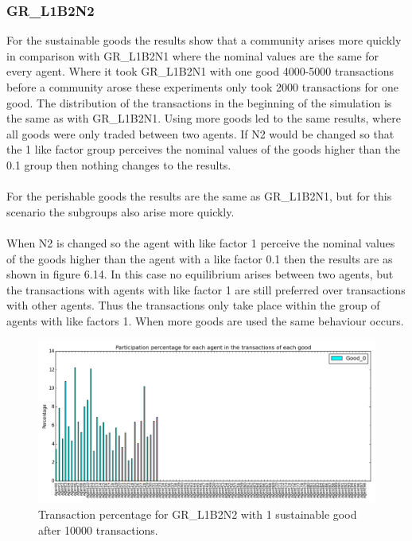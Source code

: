 \documentclass[twoside,openright]{uva-bachelor-thesis}
\begin{document}
\clearpage
\subsubsection{GR\_L1B2N2}
For the sustainable goods the results show that a community arises more quickly in comparison with GR\_L1B2N1 where the nominal values are the same for every agent. Where it took GR\_L1B2N1 with one good 4000-5000 transactions before a community arose these experiments only took 2000 transactions for one good. The distribution of the transactions in the beginning of the simulation is the same as with GR\_L1B2N1. Using more goods led to the same results, where all goods were only traded between two agents. If N2 would be changed so that the 1 like factor group perceives the nominal values of the goods higher than the 0.1 group then nothing changes to the results.\\
\\
For the perishable goods the results are the same as GR\_L1B2N1, but for this scenario the subgroups also arise more quickly.
\\
\\
When N2 is changed so the agent with like factor 1 perceive the nominal values of the goods higher than the agent with a like factor 0.1 then the results are as shown in figure 6.14. In this case no equilibrium arises between two agents, but the transactions with agents with like factor 1 are still preferred over transactions with other agents. Thus the transactions only take place within the group of agents with like factors 1. When more goods are used the same behaviour occurs. \\
\begin{figure}[h!]
\centering
\includegraphics[scale=0.4]{Simulation2_figures/GR_L1B2N2_321/Figure1_10k} 
\caption{Transaction percentage for GR\_L1B2N2 with 1 sustainable good after 10000 transactions.}
\end{figure}
\end{document}
